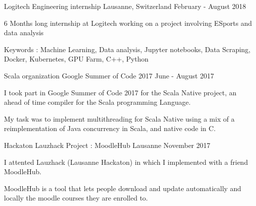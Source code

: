 \begin{cventries}
	

\cventry
{Logitech} %
{Engineering internship} %
{Lausanne, Switzerland} %
{February - August 2018} %
{ %
	\begin{cvitems}
		\item {6 Months long internship at Logitech working on a project involving ESports and data analysis}
		\item {Keywords : Machine Learning, Data analysis, Jupyter notebooks, Data Scraping, Docker, Kubernetes, GPU Farm, C++, Python}
	\end{cvitems}
}
	

\cventry
{Scala organization} %
{Google Summer of Code 2017} %
{} %
{June - August 2017} %
{ %
\begin{cvitems}
\item {I took part in Google Summer of Code 2017 for the Scala Native project, an ahead of time compiler for the Scala programming Language.}
\item {My task was to implement multithreading for Scala Native using a mix of a reimplementation of Java concurrency in Scala, and native code in C.}
\end{cvitems}
}


\cventry
{Hackaton} %
{Lauzhack Project : MoodleHub} %
{Lausanne} %
{November 2017} %
{ %
	\begin{cvitems}
		\item {I attented Lauzhack (Lausanne Hackaton) in which I implemented with a friend MoodleHub.}
		\item {MoodleHub is a tool that lets people download and update automatically and locally the moodle courses they are enrolled to.}
	\end{cvitems}
}




\end{cventries}
